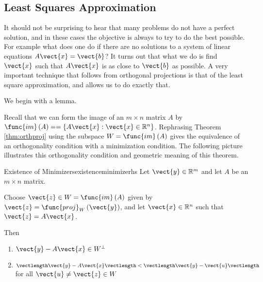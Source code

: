 \subsection{Least Squares Approximation}

It should not be surprising to hear that many problems do not have a
perfect solution, and in these cases the objective is always to try to
do the best possible. For example what does one do if there are no
solutions to a system of linear equations $A\vect{x}=\vect{b}$? It
turns out that what we do is find $\vect{x}$ such that $A\vect{x}$ is
as close to $\vect{b}$ as possible. A very important technique that
follows from orthogonal projections is that of the least square
approximation, and allows us to do
exactly that.

We begin with a lemma. 

Recall that we can form the image of an $m \times n$ matrix $A$ by
$\func{im}\left( A\right) = = \left\{ A\vect{x} : \vect{x} \in
\mathbb{R}^n \right\}$. Rephrasing Theorem \ref{thm:orthproj} using
the subspace $W=\func{im}\left( A\right)$  gives the
equivalence of an orthogonality condition with a minimization
condition. The following picture
illustrates this orthogonality condition and geometric meaning of this
theorem.

\begin{center}
\end{center}

\begin{theorem}{Existence of Minimizers}{existenceminimizerhs}\label{existenceminimizerhs}
Let $\vect{y}\in \mathbb{R}^{m}$ and let $A$ be an $m\times n$ matrix.

Choose $\vect{z}\in W= \func{im}\left( A\right)$ given by $\vect{z} =
\func{proj}_{W}\left( \vect{y}\right)$, and let $\vect{x} \in \mathbb{R}^{n}$ such that $\vect{z}=A\vect{x}$.

Then
\begin{enumerate}
\item $\vect{y} - A\vect{x} \in W^{\perp}$
\item $\vectlength \vect{y} - A\vect{x} \vectlength < \vectlength \vect{y} - \vect{u} \vectlength$ for all $\vect{u} \neq \vect{z} \in W$
\end{enumerate}
\end{theorem}

